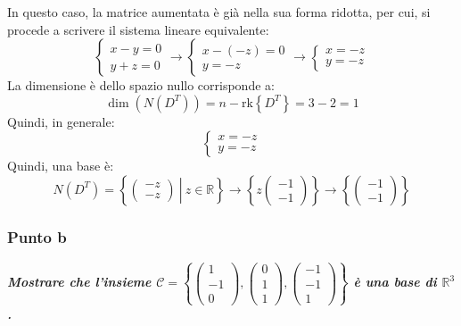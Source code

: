 \documentclass[a4paper]{article}
\begin{document}
	In questo caso, la matrice aumentata è già nella sua forma ridotta, per cui, si procede a scrivere il sistema lineare equivalente:
	\begin{equation*}
		\begin{cases}
			x - y = 0 \\
			y + z = 0
		\end{cases} \longrightarrow
		\begin{cases}
			x - \left(-z\right) = 0 \\
			y = -z
		\end{cases} \longrightarrow
		\begin{cases}
			x = -z \\
			y = -z
		\end{cases}
	\end{equation*}
	La dimensione è dello spazio nullo corrisponde a:
	\begin{equation*}
		\dim\left(N\left(D^{T}\right)\right) = n - \mathrm{rk}\left\{D^{T}\right\} = 3 - 2 = 1
	\end{equation*}
	Quindi, in generale:
	\begin{equation*}
		\begin{cases}
			x = -z \\
			y = -z 
		\end{cases}
	\end{equation*}
	Quindi, una base è:
	\begin{equation*}
		N\left(D^{T}\right) = \left\{
			\left. \begin{pmatrix}
				-z \\
				-z
			\end{pmatrix} \: \right| \:
			z \in \mathbb{R}
		\right\} \longrightarrow
		\left\{
			z\begin{pmatrix}
				-1 \\
				-1
			\end{pmatrix}
		\right\} \longrightarrow
		\left\{
			\begin{pmatrix}
				-1 \\
				-1
			\end{pmatrix}
		\right\}
	\end{equation*}\newpage

	\subsubsection{Punto b}

	\textcolor{Green4}{\textbf{\emph{Mostrare che l'insieme $\mathcal{C} = \left\{
		\begin{pmatrix}
			1 \\ -1 \\ 0
		\end{pmatrix},
		\begin{pmatrix}
			0 \\ 1 \\ 1
		\end{pmatrix},
		\begin{pmatrix}
			-1 \\ -1 \\ 1
		\end{pmatrix}
	\right\}$ è una base di $\mathbb{R}^{3}$.}}}\newline
\end{document}
